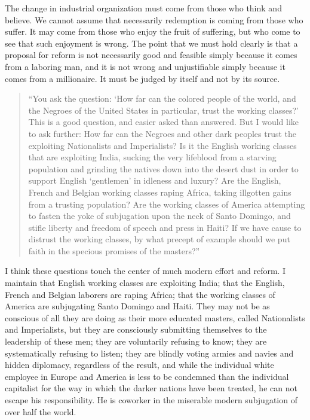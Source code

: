 \documentclass[letterpaper,10pt,english]{jupyterBook}
\begin{document}
\sphinxAtStartPar
The change in industrial organization must come from those who think and believe. We cannot assume that necessarily redemption is coming from those who suffer. It may come from those who enjoy the fruit of suffering, but who come to see that such enjoyment is wrong. The point that we must hold clearly is that a proposal for reform is not necessarily good and feasible simply because it comes from a laboring man, and it is not wrong and unjustifiable simply because it comes from a millionaire. It must be judged by itself and not by its source.
\begin{quote}

\sphinxAtStartPar
“You ask the question: ‘How far can the colored people of the world, and the Negroes of the United States in particular, trust the working classes?’ This is a good question, and easier asked than answered. But I would like to ask further: How far can the Negroes and other dark peoples trust the exploiting Nationalists and Imperialists? Is it the English working classes that are exploiting India, sucking the very life\sphinxhyphen{}blood from a starving population and grinding the natives down into the desert dust in order to support English ‘gentlemen’ in idleness and luxury? Are the English, French and Belgian working classes raping Africa, taking ill\sphinxhyphen{}gotten gains from a trusting population? Are the working classes of America attempting to fasten the yoke of subjugation upon the neck of Santo Domingo, and stifle liberty and freedom of speech and press in Haiti? If we have cause to distrust the working classes, by what precept of example should we put faith in the specious promises of the masters?”
\end{quote}

\sphinxAtStartPar
I think these questions touch the center of much modern effort and reform. I maintain that English working classes are exploiting India; that the English, French and Belgian laborers are raping Africa; that the working classes of America are subjugating Santo Domingo and Haiti. They may not be as conscious of all they are doing as their more educated masters, called Nationalists and Imperialists, but they are consciously submitting themselves to the leadership of these men; they are voluntarily refusing to know; they are systematically refusing to listen; they are blindly voting armies and navies and hidden diplomacy, regardless of the result, and while the individual white employee in Europe and America is less to be condemned than the individual capitalist for the way in which the darker nations have been treated, he can not escape his responsibility. He is co\sphinxhyphen{}worker in the miserable modern subjugation of over half the world.
\end{document}
